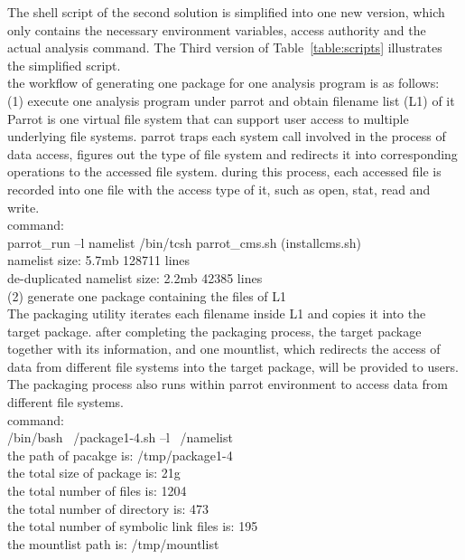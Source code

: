 \documentclass{article}
\begin{document}
The shell script of the second solution is simplified into one new version, which only contains the necessary environment variables, access authority and the actual analysis command. The Third version of Table~\ref{table:scripts} illustrates the simplified script.\\

the workflow of generating one package for one analysis program  is as follows: \\
\indent (1) execute one analysis program under parrot and obtain filename list (L1) of it\\
\indent Parrot is one virtual file system that can support user access to multiple underlying file systems. parrot traps each system call involved in the process of data access, figures out the type of file system and redirects it into corresponding operations to the accessed file system. during this process, each accessed file is recorded into one file with the access type of it, such as open, stat, read and write.\\
\indent command:\\
\indent parrot\_run –l namelist /bin/tcsh parrot\_cms.sh (installcms.sh)\\
\indent namelist size: 5.7mb     128711 lines\\
\indent de-duplicated namelist size: 2.2mb   42385 lines\\

(2) generate one package containing the files of L1 \\
\indent The packaging utility iterates each filename inside L1 and copies it into the target package. after completing the packaging process, the target package together with its information, and one mountlist, which redirects the access of data from different file systems into the target package, will be provided to users.\\

The packaging process also runs within parrot environment to access data from different file systems.\\
\indent command:\\
\indent /bin/bash ~/package1-4.sh –l ~/namelist\\
\indent the path of pacakge is: /tmp/package1-4\\
\indent the total size of package is: 21g\\
\indent the total number of files is: 1204\\
\indent the total number of directory is: 473\\
\indent the total number of symbolic link files is: 195\\
\indent the mountlist path is: /tmp/mountlist\\
\end{document}
